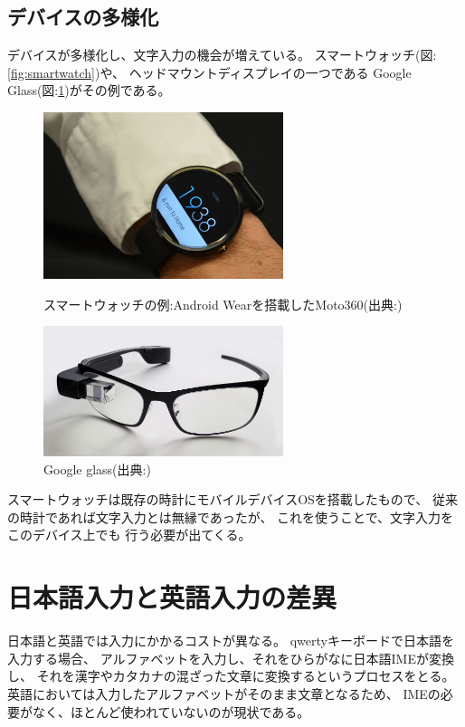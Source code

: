 \subsection{デバイスの多様化}
デバイスが多様化し、文字入力の機会が増えている。
スマートウォッチ(図:\ref{fig:smartwatch})や、
ヘッドマウントディスプレイの一つである
Google Glass(図:\ref{fig:googleglass})がその例である。
\begin{figure}[htbp]
  \begin{minipage}{0.5\hsize}
    \begin{center}
      \includegraphics[width=70mm,bb=0 0 246 171]{images/smartwatch.png}
    \end{center}
    \caption{スマートウォッチの例:Android Wearを搭載したMoto360(出典:\cite{smartwatch})}
    \label{fig:smartwatch}
  \end{minipage}
  \begin{minipage}{0.5\hsize}
    \begin{center}
      \includegraphics[width=70mm,bb=0 0 1280 697]{images/googleglass.png}
    \end{center}
    \caption{Google glass(出典:\cite{googleglass})}
    \label{fig:googleglass}
  \end{minipage}
\end{figure}
スマートウォッチは既存の時計にモバイルデバイスOSを搭載したもので、
従来の時計であれば文字入力とは無縁であったが、
これを使うことで、文字入力をこのデバイス上でも
行う必要が出てくる。

\section{日本語入力と英語入力の差異}
日本語と英語では入力にかかるコストが異なる。
qwertyキーボードで日本語を入力する場合、
アルファベットを入力し、それをひらがなに日本語IMEが変換し、
それを漢字やカタカナの混ざった文章に変換するというプロセスをとる。
英語においては入力したアルファベットがそのまま文章となるため、
IMEの必要がなく、ほとんど使われていないのが現状である。

